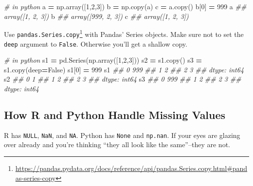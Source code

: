 \documentclass[
  12pt,
]{krantz}
\makeatletter
\newenvironment{Shaded}{\begin{snugshade}}{\end{snugshade}}
\newcommand{\CommentTok}[1]{\textcolor[rgb]{0.37,0.37,0.37}{\textit{#1}}}
\newcommand{\DecValTok}[1]{\textcolor[rgb]{0.06,0.06,0.06}{#1}}
\newcommand{\NormalTok}[1]{#1}
\newcommand{\OperatorTok}[1]{\textcolor[rgb]{0.43,0.43,0.43}{\textbf{#1}}}
\newcommand{\VariableTok}[1]{\textcolor[rgb]{0,0,0}{#1}}
\renewcommand{\href}[2]{#2\footnote{\url{#1}}}
\newenvironment{kframe}{%
\medskip{}
\setlength{\fboxsep}{.8em}
 \def\at@end@of@kframe{}%
 \ifinner\ifhmode%
  \def\at@end@of@kframe{\end{minipage}}%
  \begin{minipage}{\columnwidth}%
 \fi\fi%
 \def\FrameCommand##1{\hskip\@totalleftmargin \hskip-\fboxsep
 \colorbox{shadecolor}{##1}\hskip-\fboxsep
     \hskip-\linewidth \hskip-\@totalleftmargin \hskip\columnwidth}%
 \MakeFramed {\advance\hsize-\width
   \@totalleftmargin\z@ \linewidth\hsize
   \@setminipage}}%
 {\par\unskip\endMakeFramed%
 \at@end@of@kframe}
\renewenvironment{Shaded}{\begin{kframe}}{\end{kframe}}
\makeatother
\begin{document}
\begin{Shaded}
\begin{Highlighting}[]
\CommentTok{\# in python}
\NormalTok{a }\OperatorTok{=}\NormalTok{ np.array([}\DecValTok{1}\NormalTok{,}\DecValTok{2}\NormalTok{,}\DecValTok{3}\NormalTok{])}
\NormalTok{b }\OperatorTok{=}\NormalTok{ np.copy(a)}
\NormalTok{c }\OperatorTok{=}\NormalTok{ a.copy()}
\NormalTok{b[}\DecValTok{0}\NormalTok{] }\OperatorTok{=} \DecValTok{999}
\NormalTok{a }
\CommentTok{\#\# array([1, 2, 3])}
\NormalTok{b}
\CommentTok{\#\# array([999,   2,   3])}
\NormalTok{c}
\CommentTok{\#\# array([1, 2, 3])}
\end{Highlighting}
\end{Shaded}

Use \href{https://pandas.pydata.org/docs/reference/api/pandas.Series.copy.html\#pandas-series-copy}{\texttt{pandas.Series.copy}} with Pandas' Series objects. Make sure not to set the \texttt{deep} argument to \texttt{False}. Otherwise you'll get a shallow copy.

\begin{Shaded}
\begin{Highlighting}[]
\CommentTok{\# in python}
\NormalTok{s1 }\OperatorTok{=}\NormalTok{ pd.Series(np.array([}\DecValTok{1}\NormalTok{,}\DecValTok{2}\NormalTok{,}\DecValTok{3}\NormalTok{]))}
\NormalTok{s2 }\OperatorTok{=}\NormalTok{ s1.copy()}
\NormalTok{s3 }\OperatorTok{=}\NormalTok{ s1.copy(deep}\OperatorTok{=}\VariableTok{False}\NormalTok{)}
\NormalTok{s1[}\DecValTok{0}\NormalTok{] }\OperatorTok{=} \DecValTok{999}
\NormalTok{s1}
\CommentTok{\#\# 0    999}
\CommentTok{\#\# 1      2}
\CommentTok{\#\# 2      3}
\CommentTok{\#\# dtype: int64}
\NormalTok{s2}
\CommentTok{\#\# 0    1}
\CommentTok{\#\# 1    2}
\CommentTok{\#\# 2    3}
\CommentTok{\#\# dtype: int64}
\NormalTok{s3}
\CommentTok{\#\# 0    999}
\CommentTok{\#\# 1      2}
\CommentTok{\#\# 2      3}
\CommentTok{\#\# dtype: int64}
\end{Highlighting}
\end{Shaded}

\hypertarget{how-r-and-python-handle-missing-values}{%
\subsection{How R and Python Handle Missing Values}\label{how-r-and-python-handle-missing-values}}

R has \texttt{NULL}, \texttt{NaN}, and \texttt{NA}. Python has \texttt{None} and \texttt{np.nan}. If your eyes are glazing over already and you're thinking ``they all look like the same''--they are not.
\end{document}
